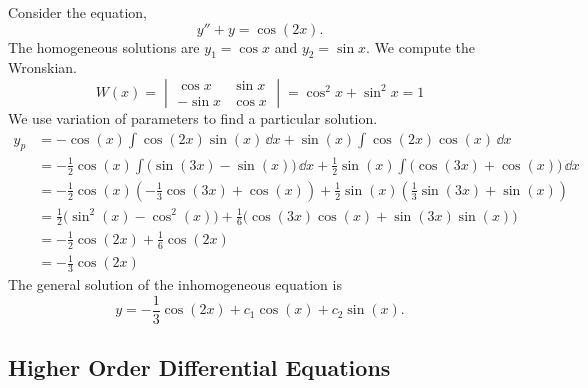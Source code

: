 \begin{Example}
  Consider the equation,
  \[ 
  y'' + y = \cos(2x).
  \]
  The homogeneous solutions are $y_1 = \cos x$ and $y_2 = \sin x$.
  We compute the Wronskian.
  \[ 
  W(x) 
  = \begin{vmatrix}
    \cos x & \sin x \\
    -\sin x & \cos x
  \end{vmatrix}
  = \cos^2 x + \sin^2 x 
  = 1
  \]
  We use variation of parameters to find a particular solution.
  \begin{align*}
    y_p     &= - \cos(x) \int \cos(2 x)\sin(x)\,\dd x
    + \sin(x) \int \cos(2 x)\cos(x)\,\dd x \\
    &= -\frac{1}{2} \cos(x) \int \big( \sin(3 x) - \sin(x) \big) \,\dd x
    + \frac{1}{2} \sin(x) \int \big( \cos(3 x)+ \cos(x) \big) \,\dd x \\
    &= -\frac{1}{2} \cos(x) \left(-\frac{1}{3}\cos(3x) + \cos(x) \right)
    + \frac{1}{2} \sin(x) \left(\frac{1}{3} \sin(3x)
      + \sin(x) \right) \\
    &= \frac{1}{2} \big(\sin^2(x) - \cos^2(x) \big)
    + \frac{1}{6} \big(\cos(3x)\cos(x) + \sin(3x)\sin(x) \big) \\
    &= -\frac{1}{2} \cos(2x)
    + \frac{1}{6} \cos(2x) \\
    &= -\frac{1}{3} \cos(2x)
  \end{align*}
  The general solution of the inhomogeneous equation is
  \[ 
  \boxed{
    y = -\frac{1}{3} \cos(2x) + c_1 \cos(x) + c_2 \sin(x).
    } 
  \]
\end{Example}











\subsection{Higher Order Differential Equations}





